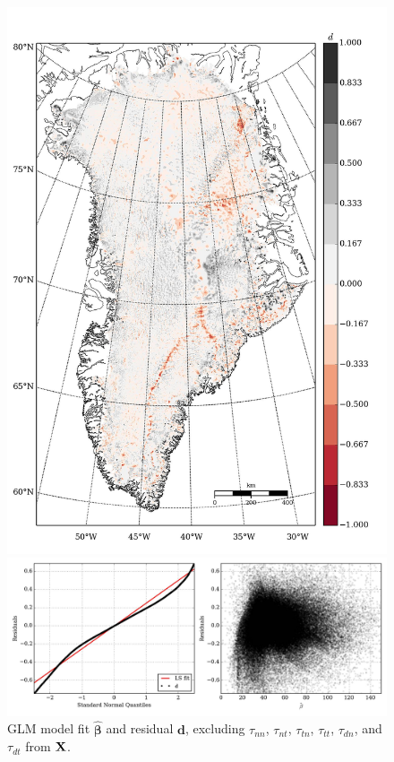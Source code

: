 \begin{figure}
\begin{minipage}[b]{0.47\linewidth}
    \includegraphics[width=1.0\textwidth]{images/greenland/stats/GLM_resid_no_stress.jpg}
  \end{minipage}
  \begin{minipage}[b]{0.99\linewidth}
    \includegraphics[width=1.0\textwidth]{images/greenland/stats/GLM_resid-NQ_no_stress.jpg}
  \end{minipage}
  \caption[]{GLM model fit $\bm{\hat{\beta}}$ and residual $\mathbf{d}$, excluding $\tau_{nn}$, $\tau_{nt}$, $\tau_{tn}$, $\tau_{tt}$, $\tau_{dn}$, and $\tau_{dt}$ from $\mathbf{X}$.}
\end{figure}

